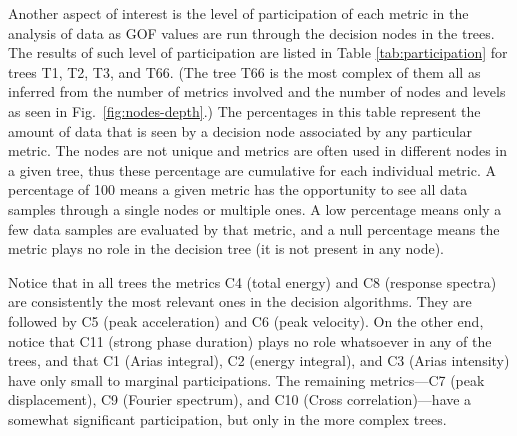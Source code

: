 Another aspect of interest is the level of participation of each metric in the analysis of data as GOF values are run through the decision nodes in the trees. The results of such level of participation are listed in Table \ref{tab:participation} for trees T1, T2, T3, and T66. (The tree T66 is the most complex of them all as inferred from the number of metrics involved and the number of nodes and levels as seen in Fig.~\ref{fig:nodes-depth}.) The percentages in this table represent the amount of data that is seen by a decision node associated by any particular metric. The nodes are not unique and metrics are often used in different nodes in a given tree, thus these percentage are cumulative for each individual metric. A percentage of 100 means a given metric has the opportunity to see all data samples through a single nodes or multiple ones. A low percentage means only a few data samples are evaluated by that metric, and a null percentage means the metric plays no role in the decision tree (it is not present in any node).

Notice that in all trees  the metrics C4 (total energy) and C8 (response spectra) are consistently the most relevant ones in the decision algorithms. They are followed by C5 (peak acceleration) and C6 (peak velocity). On the other end, notice that C11 (strong phase duration) plays no role whatsoever in any of the trees, and that C1 (Arias integral), C2 (energy integral), and C3 (Arias intensity) have only small to marginal participations. The remaining metrics---C7 (peak displacement), C9 (Fourier spectrum), and C10 (Cross correlation)---have a somewhat significant participation, but only in the more complex trees.



